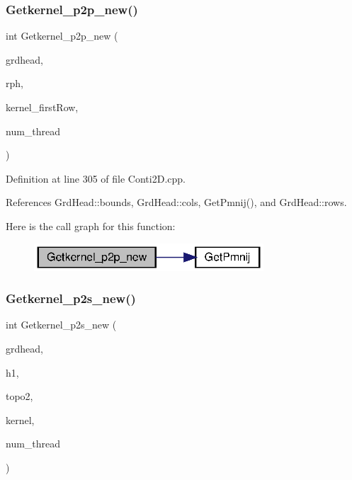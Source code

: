 \subsubsection{Getkernel\+\_\+p2p\+\_\+new()\hspace{0.1cm}{\footnotesize\ttfamily [2/2]}}
{\footnotesize\ttfamily int Getkernel\+\_\+p2p\+\_\+new (\begin{DoxyParamCaption}\item[{\textbf{ Grd\+Head}}]{grdhead,  }\item[{double}]{rph,  }\item[{double $\ast$}]{kernel\+\_\+first\+Row,  }\item[{int}]{num\+\_\+thread }\end{DoxyParamCaption})}



Definition at line 305 of file Conti2\+D.\+cpp.



References Grd\+Head\+::bounds, Grd\+Head\+::cols, Get\+Pmnij(), and Grd\+Head\+::rows.

Here is the call graph for this function\+:\nopagebreak
\begin{figure}[H]
\begin{center}
\leavevmode
\includegraphics[width=243pt]{Conti2D_8cpp_a1d72c3a10bd62305a91d64bb0de2b247_a1d72c3a10bd62305a91d64bb0de2b247_cgraph}
\end{center}
\end{figure}
\mbox{\label{Conti2D_8cpp_a78d8a6b80166f8976a0f18caddbe1dcb_a78d8a6b80166f8976a0f18caddbe1dcb}} 
\subsubsection{Getkernel\+\_\+p2s\+\_\+new()}
{\footnotesize\ttfamily int Getkernel\+\_\+p2s\+\_\+new (\begin{DoxyParamCaption}\item[{\textbf{ Grd\+Head}}]{grdhead,  }\item[{double}]{h1,  }\item[{double $\ast$}]{topo2,  }\item[{double $\ast$$\ast$}]{kernel,  }\item[{int}]{num\+\_\+thread }\end{DoxyParamCaption})}



